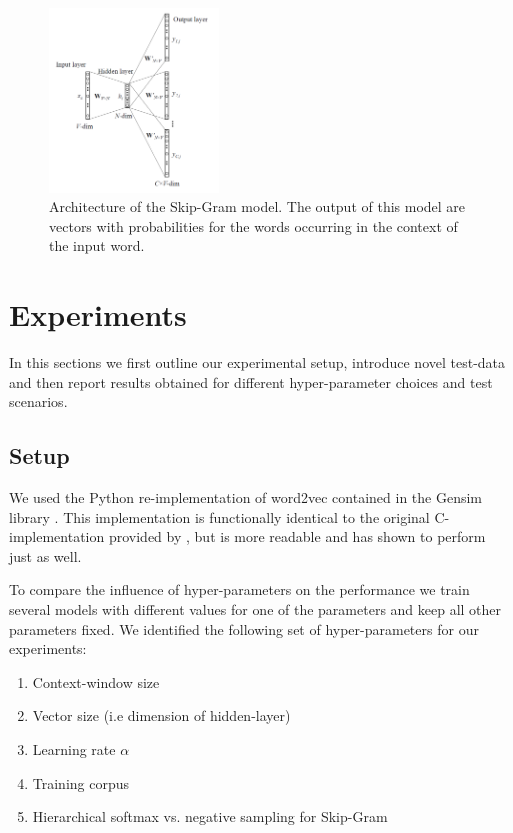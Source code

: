 \documentclass[conference]{IEEEtran}
\begin{document}
\begin{figure}[t]
\centering
\includegraphics[width=0.4\textwidth]{skip-gram}
\caption{Architecture of the Skip-Gram model. The output of this model are vectors with probabilities 
for the words occurring in the context of the input word.}
\label{fig:skip}
\end{figure}


\section{Experiments}
\label{sec:exp}

In this sections we first outline our experimental setup, introduce novel test-data
 and then report results obtained for different hyper-parameter choices and test scenarios. 

\subsection{Setup}
We used the Python re-implementation of word2vec contained in the Gensim library 
\cite{rehurek_lrec}. This implementation is functionally identical to the original 
C-implementation provided by \cite{mikolov2013efficient}, but is more readable and has 
shown to perform just as well. 

To compare the influence of hyper-parameters on the performance we train several models
with different values for one of the parameters and keep all other parameters fixed. We 
identified the following set of hyper-parameters for our experiments:
\begin{enumerate}
\item Context-window size
\item Vector size (i.e dimension of hidden-layer)
\item Learning rate $\alpha$
\item Training corpus
\item Hierarchical softmax vs. negative sampling for Skip-Gram
\end{enumerate}
\end{document}
